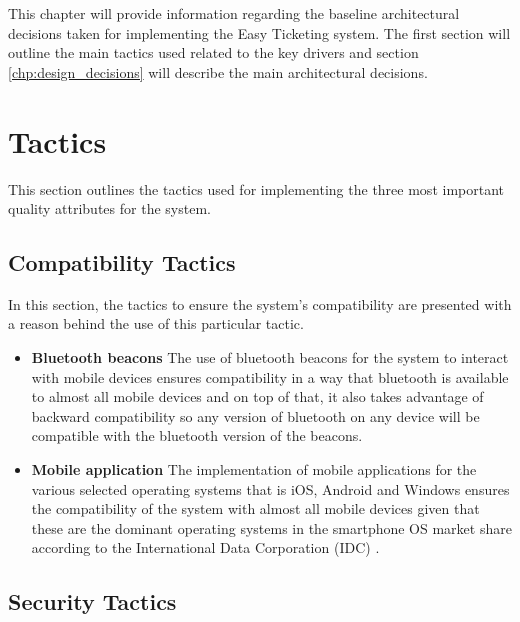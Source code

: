 This chapter will provide information regarding the baseline architectural decisions taken for implementing the Easy Ticketing system. The first section will outline the main tactics used related to the key drivers and section \ref{chp:design_decisions} will describe the main architectural decisions.
 
\section{Tactics}
This section outlines the tactics used for implementing the three most important quality attributes for the system.

\subsection{Compatibility Tactics}
In this section, the tactics to ensure the system's compatibility are presented with a reason behind the use of this particular tactic.
\begin{itemize}
\item \textbf{Bluetooth beacons} 
The use of bluetooth beacons for the system to interact with mobile devices ensures compatibility in a way that bluetooth is available to almost all mobile devices and on top of that, it also takes advantage of backward compatibility so any version of bluetooth on any device will be compatible with the bluetooth version of the beacons.

\item \textbf{Mobile application}
The implementation of mobile applications for the various selected operating systems that is iOS, Android and Windows ensures the compatibility of the system with almost all mobile devices given that these are the dominant operating systems in the smartphone OS market share according to the International Data Corporation (IDC) \cite{web:IDC}.
\end{itemize}
\subsection{Security Tactics}

